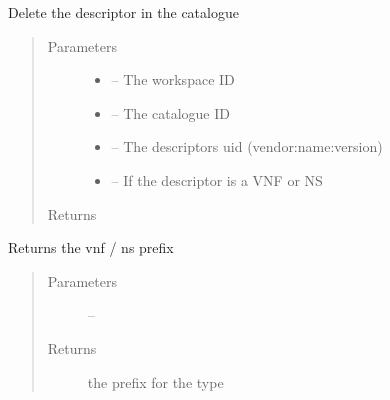 \documentclass[letterpaper,10pt,english]{sphinxmanual}
\begin{document}
\begin{fulllineitems}
\label{_source/son_editor.impl:son_editor.impl.catalogue_servicesimpl.delete_service_catalogue}
Delete the descriptor in the catalogue
\begin{quote}\begin{description}
\item[{Parameters}] \leavevmode\begin{itemize}
\item {} 
 -- The workspace ID

\item {} 
 -- The catalogue ID

\item {} 
 -- The descriptors uid (vendor:name:version)

\item {} 
 -- If the descriptor is a VNF or NS

\end{itemize}

\item[{Returns}] \leavevmode


\end{description}\end{quote}

\end{fulllineitems}


\begin{fulllineitems}
\label{_source/son_editor.impl:son_editor.impl.catalogue_servicesimpl.getType}
Returns the vnf / ns prefix
\begin{quote}\begin{description}
\item[{Parameters}] \leavevmode
{} -- 

\item[{Returns}] \leavevmode
the prefix for the type

\end{description}\end{quote}

\end{fulllineitems}
\end{document}
